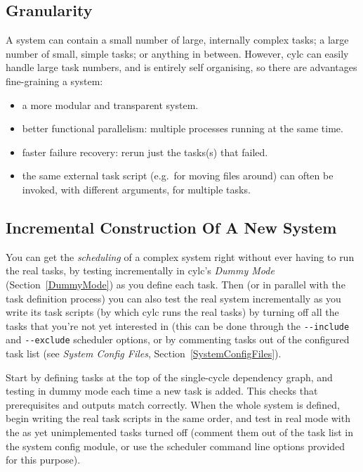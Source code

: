 \documentclass[11pt,a4paper]{article}
\begin{document}
\subsection{Granularity} 
\label{Granularity}

A system can contain a small number of large, internally complex tasks;
a large number of small, simple tasks; or anything in between. However,
cylc can easily handle large task numbers, and is entirely self
organising, so there are advantages fine-graining a system:

\begin{itemize}
    \item a more modular and transparent system.

    \item better functional parallelism: multiple processes running
        at the same time.

    \item faster failure recovery: rerun just the tasks(s) that failed. 

    \item the same external task script (e.g.\ for moving files around)
        can often be invoked, with different arguments, for multiple
        tasks.

\end{itemize}




\subsection{Incremental Construction Of A New System} 
\label{IncrementalConstructionOfANewSystem}

You can get the {\em scheduling} of a complex system right without ever
having to run the real tasks, by testing incrementally in cylc's {\em
Dummy Mode} (Section~\ref{DummyMode}) as you define each task. Then (or
in parallel with the task definition process) you can also test the real
system incrementally as you write its task scripts (by which cylc runs
the real tasks) by turning off all the tasks that you're not yet
interested in (this can be done through the \lstinline=--include= and
\lstinline=--exclude= scheduler options, or by commenting tasks out of
the configured task list (see {\em System Config Files},
Section~\ref{SystemConfigFiles}).

Start by defining tasks at the top of the single-cycle dependency graph,
and testing in dummy mode each time a new task is added. This checks
that prerequisites and outputs match correctly. When the whole system is
defined, begin writing the real task scripts in the same order, and test
in real mode with the as yet unimplemented tasks turned off (comment
them out of the task list in the system config module, or use the
scheduler command line options provided for this purpose). 
\end{document}
